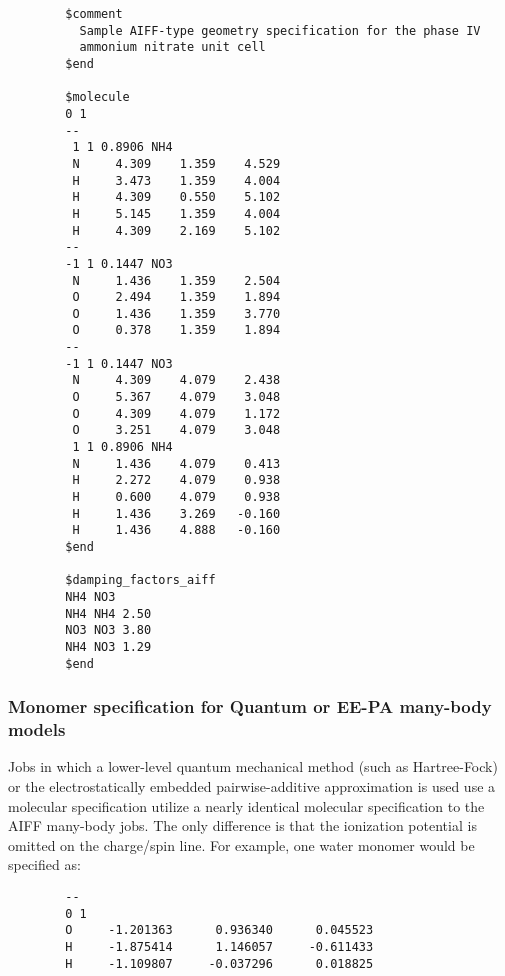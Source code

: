 \documentclass[11pt,letterpaper]{article}
\begin{document}
\begin{spacing}{1.0}
\vspace{5mm}
\hrulefill
\begin{verbatim}
        $comment
          Sample AIFF-type geometry specification for the phase IV
          ammonium nitrate unit cell
        $end

        $molecule
        0 1
        --
         1 1 0.8906 NH4
         N     4.309    1.359    4.529
         H     3.473    1.359    4.004
         H     4.309    0.550    5.102
         H     5.145    1.359    4.004
         H     4.309    2.169    5.102
        --
        -1 1 0.1447 NO3
         N     1.436    1.359    2.504
         O     2.494    1.359    1.894
         O     1.436    1.359    3.770
         O     0.378    1.359    1.894
        --
        -1 1 0.1447 NO3
         N     4.309    4.079    2.438
         O     5.367    4.079    3.048
         O     4.309    4.079    1.172
         O     3.251    4.079    3.048
         1 1 0.8906 NH4
         N     1.436    4.079    0.413
         H     2.272    4.079    0.938
         H     0.600    4.079    0.938
         H     1.436    3.269   -0.160
         H     1.436    4.888   -0.160
        $end
     
        $damping_factors_aiff
        NH4 NO3
        NH4 NH4 2.50
        NO3 NO3 3.80
        NH4 NO3 1.29
        $end
\end{verbatim}
\hrulefill







\subsubsection{Monomer specification for Quantum or EE-PA many-body models}
Jobs in which a lower-level quantum mechanical method (such as Hartree-Fock)
or the electrostatically embedded pairwise-additive approximation is used
use a molecular specification utilize a nearly identical molecular specification
to the AIFF many-body jobs.  The only difference is that the ionization
potential is omitted on the charge/spin line.  For example, one water
monomer would be specified as:\\
\vspace{5mm}
\hrulefill
\begin{verbatim}
        --
        0 1
        O     -1.201363      0.936340      0.045523
        H     -1.875414      1.146057     -0.611433
        H     -1.109807     -0.037296      0.018825
\end{verbatim}
\hrulefill




\end{spacing}
\end{document}

